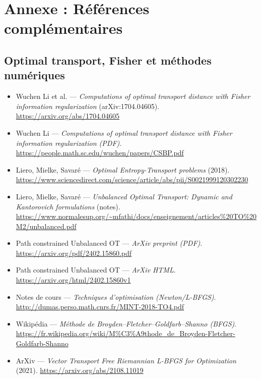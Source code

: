 \documentclass[a4paper,12pt]{article}
\begin{document}
\newpage
\section*{Annexe : Références complémentaires}

\subsection*{Optimal transport, Fisher et méthodes numériques}
\begin{itemize}
\item Wuchen Li et al. — \textit{Computations of optimal transport distance with Fisher information regularization} (arXiv:1704.04605). \url{https://arxiv.org/abs/1704.04605}
\item Wuchen Li — \textit{Computations of optimal transport distance with Fisher information regularization (PDF)}. \url{https://people.math.sc.edu/wuchen/papers/CSBP.pdf}
\item Liero, Mielke, Savaré — \textit{Optimal Entropy-Transport problems} (2018). \url{https://www.sciencedirect.com/science/article/abs/pii/S0021999120302230}
\item Liero, Mielke, Savaré — \textit{Unbalanced Optimal Transport: Dynamic and Kantorovich formulations} (notes). \url{https://www.normalesup.org/~mfathi/docs/enseignement/articles%20TO%20M2/unbalanced.pdf}
\item Path constrained Unbalanced OT — \textit{ArXiv preprint (PDF)}. \url{https://arxiv.org/pdf/2402.15860.pdf}
\item Path constrained Unbalanced OT — \textit{ArXiv HTML}. \url{https://arxiv.org/html/2402.15860v1}
\item Notes de cours — \textit{Techniques d’optimisation (Newton/L-BFGS)}. \url{http://dumas.perso.math.cnrs.fr/MINT-2018-TO4.pdf}
\item Wikipédia — \textit{Méthode de Broyden–Fletcher–Goldfarb–Shanno (BFGS)}. \url{https://fr.wikipedia.org/wiki/M%C3%A9thode_de_Broyden-Fletcher-Goldfarb-Shanno}
\item ArXiv — \textit{Vector Transport Free Riemannian L-BFGS for Optimization} (2021). \url{https://arxiv.org/abs/2108.11019}
\end{itemize}
\end{document}
